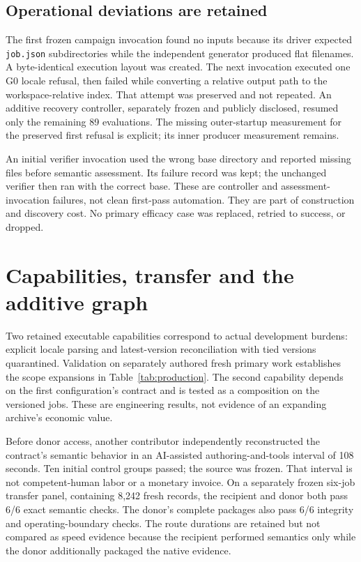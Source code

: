 \documentclass[11pt,letterpaper]{article}
\newcommand{\code}[1]{\texttt{\small #1}}
\begin{document}
\subsection{Operational deviations are retained}
The first frozen campaign invocation found no inputs because its driver expected \code{job.json} subdirectories while the independent generator produced flat filenames. A byte-identical execution layout was created. The next invocation executed one G0 locale refusal, then failed while converting a relative output path to the workspace-relative index. That attempt was preserved and not repeated. An additive recovery controller, separately frozen and publicly disclosed, resumed only the remaining 89 evaluations. The missing outer-startup measurement for the preserved first refusal is explicit; its inner producer measurement remains.

An initial verifier invocation used the wrong base directory and reported missing files before semantic assessment. Its failure record was kept; the unchanged verifier then ran with the correct base. These are controller and assessment-invocation failures, not clean first-pass automation. They are part of construction and discovery cost. No primary efficacy case was replaced, retried to success, or dropped.

\section{Capabilities, transfer and the additive graph}
Two retained executable capabilities correspond to actual development burdens: explicit locale parsing and latest-version reconciliation with tied versions quarantined. Validation on separately authored fresh primary work establishes the scope expansions in Table~\ref{tab:production}. The second capability depends on the first configuration's contract and is tested as a composition on the versioned jobs. These are engineering results, not evidence of an expanding archive's economic value.

Before donor access, another contributor independently reconstructed the contract's semantic behavior in an AI-assisted authoring-and-tools interval of 108 seconds. Ten initial control groups passed; the source was frozen. That interval is not competent-human labor or a monetary invoice. On a separately frozen six-job transfer panel, containing 8,242 fresh records, the recipient and donor both pass 6/6 exact semantic checks. The donor's complete packages also pass 6/6 integrity and operating-boundary checks. The route durations are retained but not compared as speed evidence because the recipient performed semantics only while the donor additionally packaged the native evidence.
\end{document}
